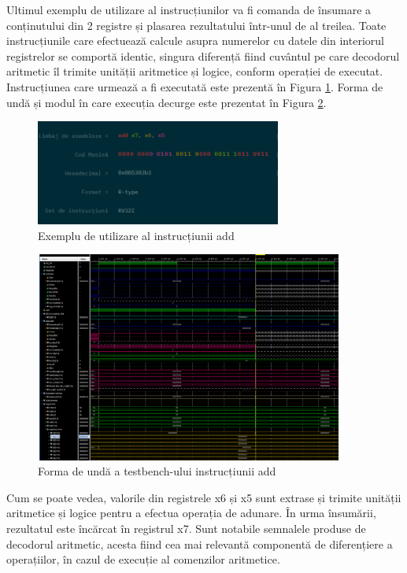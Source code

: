 \documentclass[12pt]{article}
\begin{document}
Ultimul exemplu de utilizare al instrucțiunilor va fi comanda de însumare a conținutului din 2 registre și plasarea rezultatului într-unul de al treilea. Toate instrucțiunile care efectuează calcule asupra numerelor cu datele din interiorul registrelor se comportă identic, singura diferență fiind cuvântul pe care decodorul aritmetic îl trimite unității aritmetice și logice, conform operației de executat. Instrucțiunea care urmează a fi executată este prezentă în Figura \ref{Figura:69}. Forma de undă și modul în care execuția decurge este prezentat în Figura \ref{Figura:70}.

   \begin{figure}[h!]
 \hspace*{-0.1cm}\includegraphics[width=0.72\textwidth]{rtype.png}
 \centering
 \caption{Exemplu de utilizare al instrucțiunii add}
 \label{Figura:69}
 \end{figure}

 \begin{figure}[h!]
 \hspace*{-0.1cm}\includegraphics[width=0.9\textwidth]{addexample.png}
 \centering
 \caption{Forma de undă a testbench-ului instrucțiunii add}
 \label{Figura:70}
 \end{figure}

Cum se poate vedea, valorile din registrele x6 și x5 sunt extrase și trimite unității aritmetice și logice pentru a efectua operația de adunare. În urma însumării, rezultatul este încărcat în registrul x7. Sunt notabile semnalele produse de decodorul aritmetic, acesta fiind cea mai relevantă componentă de diferențiere a operațiilor, în cazul de execuție al comenzilor aritmetice.
\end{document}
